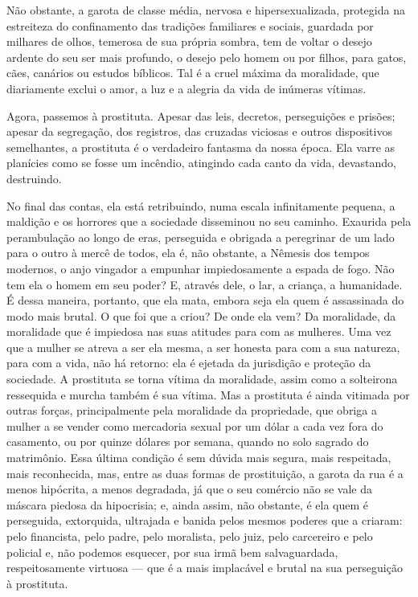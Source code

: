 Não obstante, a garota de classe média, nervosa e hipersexualizada,
protegida na estreiteza do confinamento das tradições familiares e
sociais, guardada por milhares de olhos, temerosa de sua própria sombra, 
tem de voltar o desejo ardente do seu ser mais profundo, o desejo pelo
homem ou por filhos, para gatos, cães, canários ou estudos
bíblicos. Tal é a cruel máxima da moralidade, que diariamente exclui o
amor, a luz e a alegria da vida de inúmeras vítimas.

Agora, passemos à prostituta. Apesar das leis, decretos, perseguições e
prisões; apesar da segregação, dos registros, das cruzadas viciosas e
outros dispositivos semelhantes, a prostituta é o verdadeiro fantasma da
nossa época. Ela varre as planícies como se fosse um incêndio, atingindo
cada canto da vida, devastando, destruindo.

No final das contas, ela está retribuindo, numa escala infinitamente pequena,
a maldição e os horrores que a sociedade disseminou no seu caminho.
Exaurida pela perambulação ao longo de eras, perseguida e obrigada a
peregrinar de um lado para o outro à mercê de todos, ela é, não
obstante, a Nêmesis dos tempos modernos, o anjo vingador a empunhar
impiedosamente a espada de fogo. Não tem ela o homem em seu poder? E,
através dele, o lar, a criança, a humanidade. É dessa maneira, portanto,
que ela mata, embora seja ela quem é assassinada do modo mais brutal. O
que foi que a criou? De onde ela vem? Da moralidade, da moralidade que é
impiedosa nas suas atitudes para com as mulheres. Uma vez que a mulher
se atreva a ser ela mesma, a ser honesta para com a sua natureza, para
com a vida, não há retorno: ela é ejetada da jurisdição e proteção da
sociedade. A prostituta se torna vítima da moralidade, assim como a
solteirona ressequida e murcha também é sua vítima. Mas a prostituta é
ainda vitimada por outras forças, principalmente pela moralidade da
propriedade, que obriga a mulher a se vender como mercadoria sexual por
um dólar a cada vez fora do casamento, ou por quinze dólares por
semana, quando no solo sagrado do matrimônio. Essa última condição é sem
dúvida mais segura, mais respeitada, mais reconhecida, mas, entre as
duas formas de prostituição, a garota da rua é a menos hipócrita, a
menos degradada, já que o seu comércio não se vale da máscara piedosa da
hipocrisia; e, ainda assim, não obstante, é ela quem é perseguida,
extorquida, ultrajada e banida pelos mesmos poderes que a criaram: pelo
financista, pelo padre, pelo moralista, pelo juiz, pelo carcereiro e
pelo policial e, não podemos esquecer, por sua irmã bem salvaguardada,
respeitosamente virtuosa --- que é a mais implacável e brutal na sua
perseguição à prostituta.

